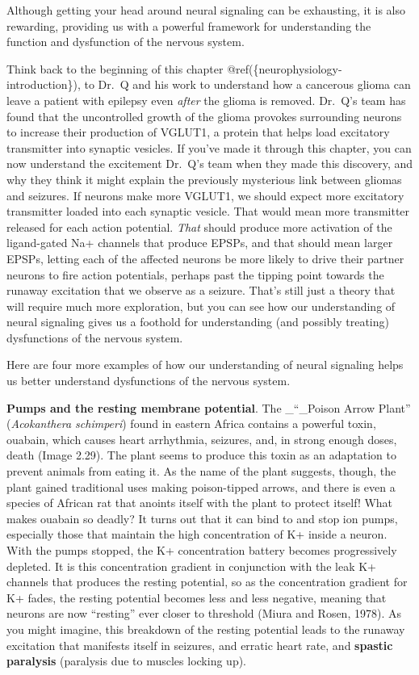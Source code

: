 \documentclass[
]{book}
\begin{document}
Although getting your head around neural signaling can be exhausting, it is also rewarding, providing us with a powerful framework for understanding the function and dysfunction of the nervous system.

Think back to the beginning of this chapter @ref(\{neurophysiology-introduction\}), to Dr.~Q and his work to understand how a cancerous glioma can leave a patient with epilepsy even \emph{after} the glioma is removed. Dr.~Q's team has found that the uncontrolled growth of the glioma provokes surrounding neurons to increase their production of VGLUT1, a protein that helps load excitatory transmitter into synaptic vesicles. If you've made it through this chapter, you can now understand the excitement Dr.~Q's team when they made this discovery, and why they think it might explain the previously mysterious link between gliomas and seizures. If neurons make more VGLUT1, we should expect more excitatory transmitter loaded into each synaptic vesicle. That would mean more transmitter released for each action potential. \emph{That} should produce more activation of the ligand-gated Na+ channels that produce EPSPs, and that should mean larger EPSPs, letting each of the affected neurons be more likely to drive their partner neurons to fire action potentials, perhaps past the tipping point towards the runaway excitation that we observe as a seizure. That's still just a theory that will require much more exploration, but you can see how our understanding of neural signaling gives us a foothold for understanding (and possibly treating) dysfunctions of the nervous system.

Here are four more examples of how our understanding of neural signaling helps us better understand dysfunctions of the nervous system.

\textbf{Pumps and the resting membrane potential}. The \_``\_Poison Arrow Plant'' (\emph{Acokanthera schimperi}) found in eastern Africa contains a powerful toxin, ouabain, which causes heart arrhythmia, seizures, and, in strong enough doses, death (Image 2.29). The plant seems to produce this toxin as an adaptation to prevent animals from eating it. As the name of the plant suggests, though, the plant gained traditional uses making poison-tipped arrows, and there is even a species of African rat that anoints itself with the plant to protect itself! What makes ouabain so deadly? It turns out that it can bind to and stop ion pumps, especially those that maintain the high concentration of K+ inside a neuron. With the pumps stopped, the K+ concentration battery becomes progressively depleted. It is this concentration gradient in conjunction with the leak K+ channels that produces the resting potential, so as the concentration gradient for K+ fades, the resting potential becomes less and less negative, meaning that neurons are now ``resting'' ever closer to threshold (Miura and Rosen, 1978). As you might imagine, this breakdown of the resting potential leads to the runaway excitation that manifests itself in seizures, and erratic heart rate, and \textbf{spastic paralysis }(paralysis due to muscles locking up).
\end{document}
